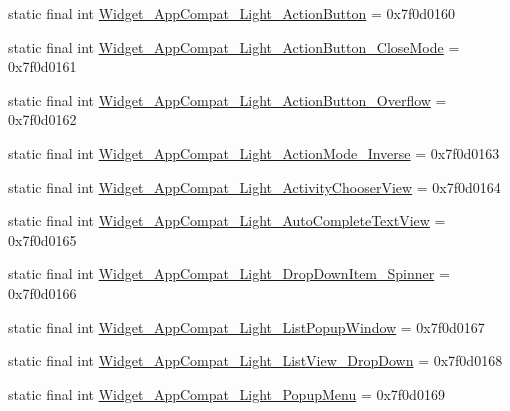 \begin{DoxyCompactItemize}
\item 
static final int \mbox{\hyperlink{classandroid_1_1support_1_1v7_1_1appcompat_1_1R_1_1style_acaf931b355085f1113e3b6eb704675ae}{Widget\+\_\+\+App\+Compat\+\_\+\+Light\+\_\+\+Action\+Button}} = 0x7f0d0160
\item 
static final int \mbox{\hyperlink{classandroid_1_1support_1_1v7_1_1appcompat_1_1R_1_1style_ad3c7c2d85cd3f22d358820d04d569c21}{Widget\+\_\+\+App\+Compat\+\_\+\+Light\+\_\+\+Action\+Button\+\_\+\+Close\+Mode}} = 0x7f0d0161
\item 
static final int \mbox{\hyperlink{classandroid_1_1support_1_1v7_1_1appcompat_1_1R_1_1style_add5dbe0e01ecdf1261ee66a28706a73f}{Widget\+\_\+\+App\+Compat\+\_\+\+Light\+\_\+\+Action\+Button\+\_\+\+Overflow}} = 0x7f0d0162
\item 
static final int \mbox{\hyperlink{classandroid_1_1support_1_1v7_1_1appcompat_1_1R_1_1style_ae4bb55ea86baa80af869e20ee5e13385}{Widget\+\_\+\+App\+Compat\+\_\+\+Light\+\_\+\+Action\+Mode\+\_\+\+Inverse}} = 0x7f0d0163
\item 
static final int \mbox{\hyperlink{classandroid_1_1support_1_1v7_1_1appcompat_1_1R_1_1style_a30088bd610ce6ddc26c4b238f5fe5593}{Widget\+\_\+\+App\+Compat\+\_\+\+Light\+\_\+\+Activity\+Chooser\+View}} = 0x7f0d0164
\item 
static final int \mbox{\hyperlink{classandroid_1_1support_1_1v7_1_1appcompat_1_1R_1_1style_acf51db74e8bac502d7f6b925d770ddb4}{Widget\+\_\+\+App\+Compat\+\_\+\+Light\+\_\+\+Auto\+Complete\+Text\+View}} = 0x7f0d0165
\item 
static final int \mbox{\hyperlink{classandroid_1_1support_1_1v7_1_1appcompat_1_1R_1_1style_afde000240c9b9a8bdd20c4e2717b4e63}{Widget\+\_\+\+App\+Compat\+\_\+\+Light\+\_\+\+Drop\+Down\+Item\+\_\+\+Spinner}} = 0x7f0d0166
\item 
static final int \mbox{\hyperlink{classandroid_1_1support_1_1v7_1_1appcompat_1_1R_1_1style_abfa51aa4e5ff8b59414f140fdcb09c3f}{Widget\+\_\+\+App\+Compat\+\_\+\+Light\+\_\+\+List\+Popup\+Window}} = 0x7f0d0167
\item 
static final int \mbox{\hyperlink{classandroid_1_1support_1_1v7_1_1appcompat_1_1R_1_1style_a9bab891cd272faea9b47904984f006d3}{Widget\+\_\+\+App\+Compat\+\_\+\+Light\+\_\+\+List\+View\+\_\+\+Drop\+Down}} = 0x7f0d0168
\item 
static final int \mbox{\hyperlink{classandroid_1_1support_1_1v7_1_1appcompat_1_1R_1_1style_a7a5a45143d9d2b8450d944430e6da1dc}{Widget\+\_\+\+App\+Compat\+\_\+\+Light\+\_\+\+Popup\+Menu}} = 0x7f0d0169
\item 

\end{DoxyCompactItemize}
